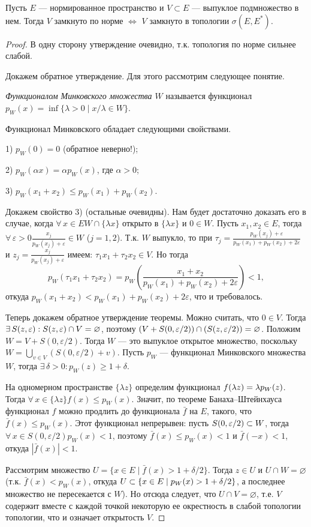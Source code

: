 \documentclass[10pt]{article}
\newcommand*{\p}[1]{#1\nobreak\discretionary{}{\hbox{$\mathsurround=0pt #1$}}{}}
\begin{document}
\begin{theorem}
Пусть $E$ --- нормированное пространство  и $V\subset E$ ---
выпуклое подмножество в нем. Тогда $V$ замкнуто по норме
$\Leftrightarrow$ $V$ замкнуто в топологии $\sigma(E, E^*)$.
\end{theorem}

\begin{proof}
В одну сторону утверждение очевидно, т.к. топология по норме сильнее
слабой.

Докажем обратное утверждение. Для этого рассмотрим следующее
понятие.

\begin{df}
\emph{Функционалом Минковского множества $W$} называется функционал
$p_W(x)=\inf\{\lambda>0\mid x/\lambda\in W\}$.
\end{df}

Функционал Минковского обладает следующими свойствами.

1) $p_W(0)=0$  (обратное неверно!);

2) $p_W(\alpha x)=\alpha p_W(x)$, где $\alpha>0$;

3) $p_W(x_1+x_2)\leqslant p_W(x_1)+p_W(x_2)$.

Докажем свойство 3) (остальные очевидны). Нам будет достаточно
доказать его в случае, когда $\forall\,x\in E$\;\;$W\cap\{\lambda
x\}$ открыто в $\{\lambda x\}$ и $0\in W$. Пусть $x_1,x_2\in E$,
тогда
$\forall\,\varepsilon>0$\;\;$\frac{x_j}{p_W(x_j)+\varepsilon}\in W$
($j=1,2$). Т.к. $W$ выпукло, то при
$\tau_j=\frac{p_W(x_j)+\varepsilon}{p_W(x_1)+p_W(x_2)+2\varepsilon}$
и $z_j=\frac{x_j}{p_W(x_j)+\varepsilon}$ имеем: $\tau_1
x_1+\tau_2x_2\in V$. Но тогда $$p_W(\tau_1 x_1+\tau_2x_2)=p_W\left(
\frac{x_1+x_2}{p_W(x_1)+p_W(x_2)+2\varepsilon}\right)<1,$$ откуда
$p_W(x_1+x_2)<p_W(x_1)+p_W(x_2)+2\varepsilon$, что и требовалось.

Теперь докажем обратное утверждение теоремы. Можно считать, что
$0\in V$. Тогда $\exists\,S(z,\varepsilon):S(z,\varepsilon)\p\cap
V=\varnothing$, поэтому
$(V+S(0,\varepsilon/2))\p\cap(S(z,\varepsilon/2))=\varnothing$.
Положим $W=V+S(0,\varepsilon/2)$. Тогда $W$ --- это выпуклое
открытое множество, поскольку $W=\bigcup\limits_{v\in
V}(S(0,\varepsilon/2)+v)$. Пусть $p_W$ --- функционал Минковского
множества $W$, тогда $\exists\,\delta>0:p_W(z)\geqslant 1+\delta$.

На одномерном пространстве $\{\lambda z\}$ определим функционал
$f(\lambda z)\p=\lambda p_W(z)$. Тогда $\forall\,x\in\{\lambda
z\}$\;\;$f(x)\leqslant p_W(x)$. Значит, по теореме
Банаха--Штейнхауса функционал $f$ можно продлить до функционала
$\bar{f}$ на $E$, такого, что $\bar{f}(x)\leqslant p_W(x)$. Этот
функционал непрерывен: пусть $S(0,\varepsilon/2)\p\subset W$, тогда
$\forall\,x\in S(0,\varepsilon/2)$\;\;$p_W(x)<1$, поэтому
$\bar{f}(x)\leqslant p_W(x)<1$ и $\bar{f}(-x)<1$, откуда
$|\bar{f}(x)|<1$.

Рассмотрим множество $U=\{x\in E\mid \bar{f}(x)>1+\delta/2\}$. Тогда
$z\in U$ и $U\cap W=\varnothing$ (т.к. $\bar{f}(x)<p_W(x)$, откуда
$U\subset \{x\in E\mid p_W(x)>1\p+\delta/2\}$, а последнее множество
не пересекается с $W$). Но отсюда следует, что $U\cap
V=\varnothing$, т.е. $V$ содержит вместе с каждой точкой некоторую
ее окрестность в слабой топологии топологии, что и означает
открытость $V$.
\end{proof}
\end{document}

